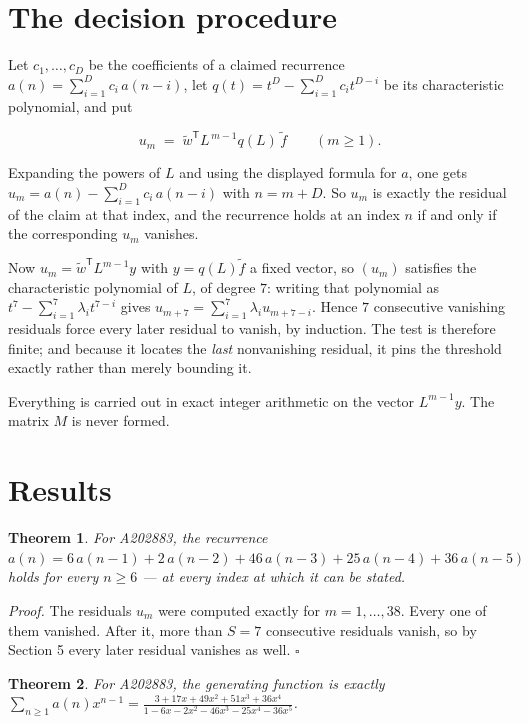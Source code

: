 \documentclass[11pt]{article}
\newtheorem{theorem}{Theorem}
\theoremstyle{definition}
\begin{document}
\section{The decision procedure}

Let $c_1,\dots,c_D$ be the coefficients of a claimed recurrence $a(n) = \sum_{i=1}^{D} c_i\,a(n-i)$, let $q(t) = t^{D} - \sum_{i=1}^{D} c_i t^{D-i}$ be its characteristic polynomial, and put

\[u_m \;=\; \tilde w^{\mathsf T} L^{\,m-1} q(L)\,\tilde f \qquad (m \ge 1).\]

Expanding the powers of $L$ and using the displayed formula for $a$, one gets $u_m = a(n) - \sum_{i=1}^{D} c_i\,a(n-i)$ with $n = m + D$. So $u_m$ is exactly the residual of the claim at that index, and the recurrence holds at an index $n$ if and only if the corresponding $u_m$ vanishes.

Now $u_m = \tilde w^{\mathsf T} L^{m-1} y$ with $y = q(L)\tilde f$ a fixed vector, so $(u_m)$ satisfies the characteristic polynomial of $L$, of degree $7$: writing that polynomial as $t^{7} - \sum_{i=1}^{7} \lambda_i t^{7-i}$ gives $u_{m+7} = \sum_{i=1}^{7} \lambda_i u_{m+7-i}$. Hence $7$ consecutive vanishing residuals force every later residual to vanish, by induction. The test is therefore finite; and because it locates the {\itshape last} nonvanishing residual, it pins the threshold exactly rather than merely bounding it.

Everything is carried out in exact integer arithmetic on the vector $L^{m-1}y$. The matrix $M$ is never formed.

\section{Results}

\begin{theorem} For A202883, the recurrence $a(n) = 6\,a(n-1) + 2\,a(n-2) + 46\,a(n-3) + 25\,a(n-4) + 36\,a(n-5)$ holds for every $n \ge 6$ --- at every index at which it can be stated.\end{theorem}

{\itshape Proof.} The residuals $u_m$ were computed exactly for $m = 1,\dots,38$. Every one of them vanished. After it, more than $S = 7$ consecutive residuals vanish, so by Section 5 every later residual vanishes as well. $\square$

\begin{theorem} For A202883, the generating function is exactly $\sum_{n\ge 1} a(n)x^{n-1} = \frac{3 + 17x + 49x^{2} + 51x^{3} + 36x^{4}}{1 - 6x - 2x^{2} - 46x^{3} - 25x^{4} - 36x^{5}}$.\end{theorem}
\end{document}
